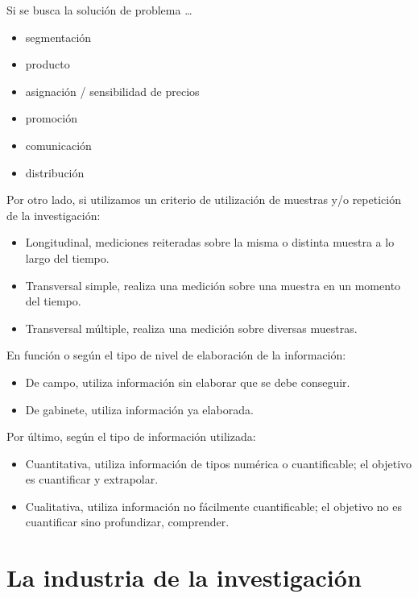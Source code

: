 \documentclass[
]{book}
\providecommand{\tightlist}{%
  \setlength{\itemsep}{0pt}\setlength{\parskip}{0pt}}
\begin{document}
Si se busca la solución de problema \ldots{}

\begin{itemize}
\tightlist
\item
  segmentación
\item
  producto
\item
  asignación / sensibilidad de precios
\item
  promoción
\item
  comunicación
\item
  distribución
\end{itemize}

Por otro lado, si utilizamos un criterio de utilización de muestras y/o repetición de la investigación:

\begin{itemize}
\tightlist
\item
  Longitudinal, mediciones reiteradas sobre la misma o distinta muestra a lo largo del tiempo.
\item
  Transversal simple, realiza una medición sobre una muestra en un momento del tiempo.
\item
  Transversal múltiple, realiza una medición sobre diversas muestras.
\end{itemize}

En función o según el tipo de nivel de elaboración de la información:

\begin{itemize}
\tightlist
\item
  De campo, utiliza información sin elaborar que se debe conseguir.
\item
  De gabinete, utiliza información ya elaborada.
\end{itemize}

Por último, según el tipo de información utilizada:

\begin{itemize}
\tightlist
\item
  Cuantitativa, utiliza información de tipos numérica o cuantificable; el objetivo es cuantificar y extrapolar.
\item
  Cualitativa, utiliza información no fácilmente cuantificable; el objetivo no es cuantificar sino profundizar, comprender.
\end{itemize}

\hypertarget{la-industria-de-la-investigaciuxf3n}{%
\section{La industria de la investigación}\label{la-industria-de-la-investigaciuxf3n}}
\end{document}
